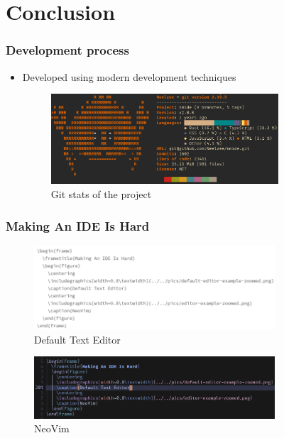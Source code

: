 \section{Conclusion}
\SectionPage

\begin{frame}
  \frametitle{Development process}
  \begin{itemize}
    \item Developed using modern development techniques
    \pause
  \begin{figure}
    \centering
    \includegraphics[width=0.8\textwidth]{./pics/onefetch.png}
    \caption{Git stats of the project}
  \end{figure}
  \end{itemize}
\end{frame}

\begin{frame}
  \frametitle{Making An IDE Is Hard}
  \begin{figure}
    \centering
    \includegraphics[width=0.8\textwidth]{./pics/default-editor-example-zoomed.png}
    \caption{Default Text Editor}
  \end{figure}
  \begin{figure}
    \centering
    \includegraphics[width=0.8\textwidth]{./pics/editor-example-zoomed.png}
    \caption{NeoVim}
  \end{figure}
\end{frame}

